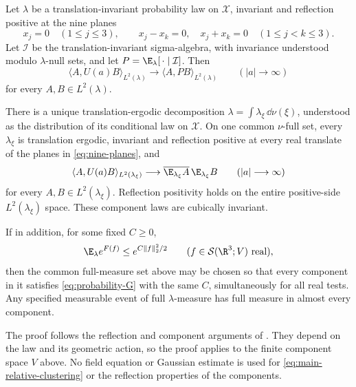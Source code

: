 \begin{theorem}\label{thm:components-clustering}
Let \(\lambda\) be a translation-invariant probability law on
\(\mathcal X\), invariant and reflection positive at the nine planes
\begin{equation}\label{eq:nine-planes}
 x_j=0\quad(1\le j\le3),\qquad
 x_j-x_k=0,\quad x_j+x_k=0\quad(1\le j<k\le3).
\end{equation}
Let \(\mathcal I\) be the translation-invariant sigma-algebra,
with invariance understood modulo \(\lambda\)-null sets, and let
\(P=\E_\lambda[\,\cdot\mid\mathcal I]\). Then
\begin{equation}\label{eq:main-relative-clustering}
 \langle A,U(a)B\rangle_{L^2(\lambda)}
 \longrightarrow\langle A,PB\rangle_{L^2(\lambda)}
 \qquad(|a|\longrightarrow\infty)
\end{equation}
for every \(A,B\in L^2(\lambda)\).

There is a unique translation-ergodic decomposition
\(\lambda=\int\lambda_\xi\,\dd\nu(\xi)\), understood as the
distribution of its conditional law on \(\mathcal X\).
On one common \(\nu\)-full set, every \(\lambda_\xi\) is
translation ergodic, invariant and reflection positive at every
real translate of the planes in \eqref{eq:nine-planes}, and
\begin{equation}\label{eq:main-component-clustering}
 \langle A,U(a)B\rangle_{L^2(\lambda_\xi)}
 \longrightarrow
 \overline{\E_{\lambda_\xi}A}\,\E_{\lambda_\xi}B
 \qquad(|a|\longrightarrow\infty)
\end{equation}
for every \(A,B\in L^2(\lambda_\xi)\).
Reflection positivity holds on the entire positive-side
\(L^2(\lambda_\xi)\) space. These component laws are cubically invariant.

If in addition, for some fixed \(C\ge0\),
\begin{equation}\label{eq:probability-G}
 \E_\lambda e^{F(f)}\le e^{C\|f\|_2^2/2}
 \qquad(f\in\mathcal S(\R^3;V)\text{ real}),
\end{equation}
then the common full-measure set above may be chosen so that every
component in it satisfies \eqref{eq:probability-G} with the same
\(C\), simultaneously for all real tests.
Any specified measurable event of full \(\lambda\)-measure has
full measure in almost every component.
\end{theorem}

The proof follows the reflection and component arguments of
\cite[Section~7]{QED3Manuscript}. They depend on the law and its
geometric action, so the proof applies to the finite component
space \(V\) above. No field equation or Gaussian estimate is used
for \eqref{eq:main-relative-clustering} or the reflection properties
of the components.

